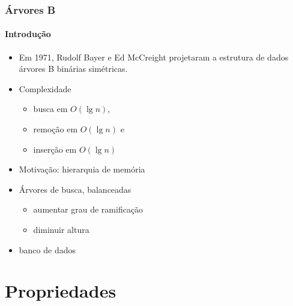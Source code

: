 \documentclass{beamer}
\begin{document}
\begin{frame}

  \frametitle{Árvores B}
  \framesubtitle{Introdução}

  
  \begin{itemize}
    
  \item Em 1971, Rudolf Bayer e Ed McCreight projetaram a estrutura de dados
    \alert{árvores B binárias simétricas}.

  \item Complexidade
    \begin{itemize}
    \item busca em $O(\lg n)$, 
    \item remoção em $O(\lg n)$ e
    \item inserção em $O(\lg n)$
    \end{itemize}

  \item Motivação: hierarquia de memória

  \item Árvores de busca, balanceadas 

    \begin{itemize}

      \item aumentar grau de ramificação

      \item diminuir altura

    \end{itemize}

  \item banco de dados

  \end{itemize}

\end{frame}

\section{Propriedades}
\end{document}
